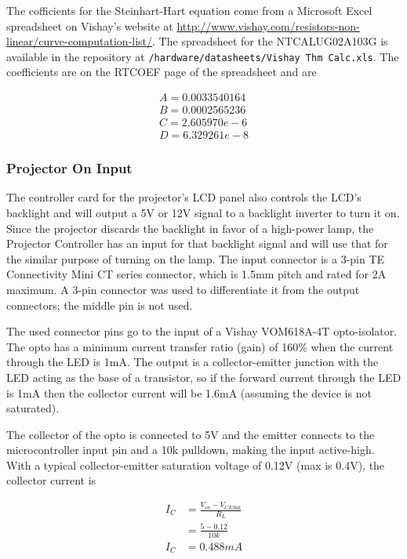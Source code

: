 \documentclass{article}
\begin{document}
The cofficients for the Steinhart-Hart equation come from a Microsoft Excel spreadsheet on Vishay's
website at \url{http://www.vishay.com/resistors-non-linear/curve-computation-list/}.  The
spreadsheet for the NTCALUG02A103G is available in the repository at
\texttt{/hardware/datasheets/Vishay Thm Calc.xls}.  The coefficients are on the RTCOEF page of the
spreadsheet and are

\begin{align*}
    A = 0.0033540164 \\
    B = 0.0002565236 \\
    C = 2.605970e-6 \\
    D = 6.329261e-8
\end{align*}

\subsubsection{Projector On Input} \label{sssec:PJOnInput}
The controller card for the projector's LCD panel also controls the LCD's backlight and will output
a 5V or 12V signal to a backlight inverter to turn it on.  Since the projector discards the
backlight in favor of a high-power lamp, the Projector Controller has an input for that backlight
signal and will use that for the similar purpose of turning on the lamp.  The input connector is a
3-pin TE Connectivity Mini CT series connector, which is 1.5mm pitch and rated for 2A maximum.  A
3-pin connector was used to differentiate it from the output connectors; the middle pin is not used.

The used connector pins go to the input of a Vishay VOM618A-4T opto-isolator. The opto has a minimum
current transfer ratio (gain) of 160\% when the current through the LED is 1mA.  The output is a
collector-emitter junction with the LED acting as the base of a transistor, so if the forward
current through the LED is 1mA then the collector current will be 1.6mA (assuming the device is not
saturated).

The collector of the opto is connected to 5V and the emitter connects to the microcontroller input
pin and a 10k\textOmega{} pulldown, making the input active-high.  With a typical collector-emitter
saturation voltage of 0.12V (max is 0.4V), the collector current is

\begin{align*}
    I_C &= \frac{V_{in} - V_{CESat}}{R_L} \\
    &= \frac{5 - 0.12}{10k} \\
    I_C &= 0.488mA
\end{align*}
\end{document}
